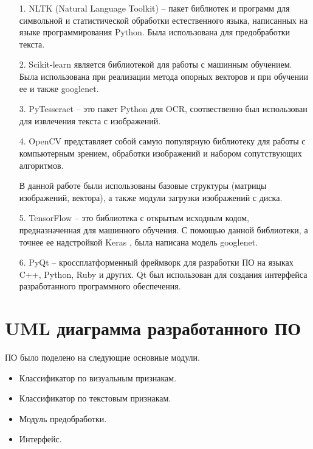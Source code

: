 \begin{enumerate}
\item[1.] NLTK (Natural Language Toolkit) \cite{nltk} -- пакет библиотек и программ для символьной и статистической обработки естественного языка, написанных на языке программирования Python. Была использована для предобработки текста.

\item[2.] Scikit-learn \cite{scikit} является библиотекой для работы с машинным обучением. Была использована при реализации метода опорных векторов и при обучении ее и также googlenet.

\item[3.] PyTesseract \cite{pytesseract} -- это пакет Python для OCR, соотвественно был использован для извлечения текста с изображений.

\item[4.] OpenCV \cite{opencv} представляет собой самую популярную библиотеку для работы с компьютерным зрением, обработки изображений и набором сопутствующих алгоритмов.

В данной работе были использованы базовые структуры (матрицы изображений, вектора), а также модули загрузки изображений с диска.

\item[5.] TensorFlow \cite{tensorflow} -- это библиотека с открытым исходным кодом, предназначенная для машинного обучения. С помощью данной библиотеки, а точнее ее надстройкой Keras \cite{keras}, была написана модель googlenet.

\item[6.] PyQt \cite{pyqt} -- кроссплатформенный фреймворк для разработки ПО на языках C++, Python, Ruby и других. Qt был использован для создания интерфейса разработанного программного обеспечения. 
\end{enumerate}

\section{UML диаграмма разработанного ПО }

ПО было поделено на следующие основные модули.
\begin{itemize}
\item Классификатор по визуальным признакам.
\item Классификатор по текстовым признакам.
\item Модуль предобработки.
\item Интерфейс.
\end{itemize}


